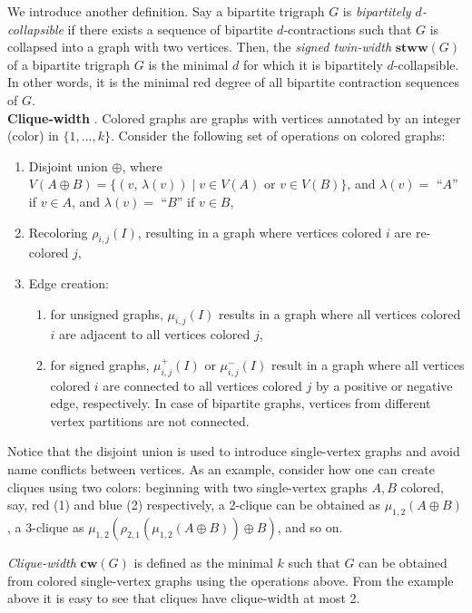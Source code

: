 \documentclass{article}
\begin{document}
We introduce another definition.
Say a bipartite trigraph $G$ is {\em bipartitely $d$-collapsible} if there exists a sequence of bipartite $d$-contractions such that $G$ is collapsed into a graph with two vertices.
Then, the {\em signed twin-width} $\textbf{stww}(G)$ of a bipartite trigraph $G$ is the minimal $d$ for which it is bipartitely $d$-collapsible.
In other words, it is the minimal red degree of all bipartite contraction sequences of $G$.\\

\noindent
\textbf{Clique-width} \cite{DBLP:journals/dam/FischerMR08}.
Colored graphs are graphs with vertices annotated by an integer (color) in $\{1,...,k\}$.
Consider the following set of operations on colored graphs:
\begin{enumerate}
	\item Disjoint union $\oplus$, where $V(A \oplus B)=\{ (v,\, \lambda(v)) \; | \; v \in V(A) \text{ or } v\in V(B) \}$, and $\lambda(v)=$ ``$A$'' if $v\in A$, and $\lambda(v)=$ ``$B$'' if $v\in B$,
	\item Recoloring $\rho_{i,j}(I)$, resulting in a graph where vertices colored $i$ are re-colored $j$,
	\item Edge creation:
	\begin{enumerate}
		\item for unsigned graphs, $\mu_{i,j}(I)$ results in a graph where all vertices colored $i$ are adjacent to all vertices colored $j$,
		\item for signed graphs, $\mu_{i,j}^+(I)$ or $\mu_{i,j}^-(I)$ result in a graph where all vertices colored $i$ are connected to all vertices colored $j$ by a positive or negative edge, respectively. In case of bipartite graphs, vertices from different vertex partitions are not connected.
	\end{enumerate}
\end{enumerate}

\noindent
Notice that the disjoint union is used to introduce single-vertex graphs and avoid name conflicts between vertices.
As an example, consider how one can create cliques using two colors: beginning with two single-vertex graphs $A, B$ colored, say, red (1) and blue (2) respectively, a 2-clique can be obtained as $\mu_{1,2}(A \oplus B)$, a 3-clique as $\mu_{1,2}(\rho_{2,1}(\mu_{1,2}(A \oplus B)) \oplus B)$, and so on.

{\em Clique-width} $\textbf{cw}(G)$ is defined as the minimal $k$ such that $G$ can be obtained from colored single-vertex graphs using the operations above.
From the example above it is easy to see that cliques have clique-width at most 2.\\
\end{document}

